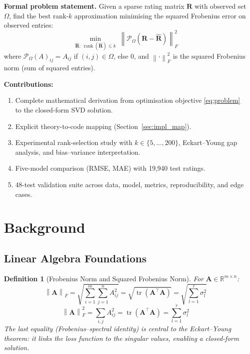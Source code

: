 \documentclass[12pt, a4paper]{article}
\newtheorem{definition}[theorem]{Definition}
\newcommand{\R}{\mathbb{R}}
\newcommand{\Rmat}{\mathbf{R}}
\newcommand{\norm}[1]{\left\| #1 \right\|}
\newcommand{\Fro}[1]{\norm{#1}_{F}}
\newcommand{\FroSq}[1]{\norm{#1}_{F}^{2}}
\newcommand{\Om}{\Omega}
\newcommand{\Proj}{\mathcal{P}_{\Omega}}
\DeclareMathOperator*{\rank}{rank}
\begin{document}
\medskip
\noindent\textbf{Formal problem statement.}
Given a sparse rating matrix $\Rmat$ with observed set $\Om$, find the
best rank-$k$ approximation minimising the squared Frobenius error on
observed entries:
\begin{equation}
  \boxed{
    \min_{\hat{\Rmat}:\ \rank(\hat{\Rmat}) \leq k}
    \;\FroSq{\Proj(\Rmat - \hat{\Rmat})}
  }
  \label{eq:problem}
\end{equation}
where $\Proj(A)_{ij} = A_{ij}$ if $(i,j)\in\Om$, else $0$, and
$\FroSq{\cdot}$ is the squared Frobenius norm (sum of squared entries).

\noindent\textbf{Contributions:}
\begin{enumerate}[leftmargin=1.5em]
  \item Complete mathematical derivation from optimisation objective
        \eqref{eq:problem} to the closed-form SVD solution.
  \item Explicit theory-to-code mapping (Section~\ref{sec:impl_map}).
  \item Experimental rank-selection study with $k\in\{5,\ldots,200\}$,
        Eckart--Young gap analysis, and bias--variance interpretation.
  \item Five-model comparison (RMSE, MAE) with 19{,}940 test ratings.
  \item 48-test validation suite across data, model, metrics,
        reproducibility, and edge cases.
\end{enumerate}

\section{Background}
\label{sec:background}

\subsection{Linear Algebra Foundations}

\begin{definition}[Frobenius Norm and Squared Frobenius Norm]
For $\mathbf{A} \in \R^{m \times n}$:
\[
  \Fro{\mathbf{A}} = \sqrt{\sum_{i=1}^{m}\sum_{j=1}^{n} A_{ij}^2}
  = \sqrt{\operatorname{tr}(\mathbf{A}^\top \mathbf{A})}
  = \sqrt{\sum_{l=1}^{r} \sigma_l^2}
\]
\[
  \FroSq{\mathbf{A}} = \sum_{i,j} A_{ij}^2
  = \operatorname{tr}(\mathbf{A}^\top \mathbf{A})
  = \sum_{l=1}^{r} \sigma_l^2
\]
The last equality (Frobenius--spectral identity) is central to the
Eckart--Young theorem: it links the loss function to the singular
values, enabling a closed-form solution.
\end{definition}
\end{document}
